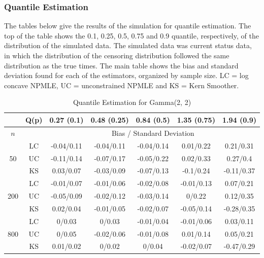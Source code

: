 \documentclass[12pt]{article}
\numberwithin{equation}{section}
\begin{document}
	
	{\subsubsection{Quantile Estimation} } 
	
		The tables below give the results of the simulation for quantile estimation. The top of the table shows the 0.1, 0.25, 0.5, 0.75 and 0.9 quantile, respectively, of the distribution of the simulated data. The simulated data was current status data, in which the distribution of the censoring distribution followed the same distribution as the true times. The main table shows the bias and standard deviation found for each of the estimators, organized by sample size. LC = log concave NPMLE, UC = unconstrained NPMLE and KS = Kern Smoother.
	


\begin{table}[H]

\begin{center}	
\caption{Quantile Estimation for Gamma(2, 2)}

\begin{tabular} {| c | c | c | c | c | c | c | } 


	 \hline
		&Q(p)&	0.27 (0.1)&	0.48 (0.25)&	0.84 (0.5)&	1.35 (0.75)&	1.94 (0.9)\\ 
 \hline 
 	$n$ & & \multicolumn{5}{|c|}{Bias / Standard Deviation} 
 \\ 
 \hline 
\multirow{3}{*}{50}		&	LC	&-0.04/0.11	&-0.04/0.11	&-0.04/0.14	&0.01/0.22	&0.21/0.31\\ 
			&	UC	&-0.11/0.14	&-0.07/0.17	&-0.05/0.22	&0.02/0.33	&0.27/0.4\\ 
			&	KS	&0.03/0.07	&-0.03/0.09	&-0.07/0.13	&-0.1/0.24	&-0.11/0.37\\ 
	\hline 
\multirow{3}{*}{200}		&	LC	&-0.01/0.07	&-0.01/0.06	&-0.02/0.08	&-0.01/0.13	&0.07/0.21\\ 
			&	UC	&-0.05/0.09	&-0.02/0.12	&-0.03/0.14	&0/0.22	&0.12/0.35\\ 
			&	KS	&0.02/0.04	&-0.01/0.05	&-0.02/0.07	&-0.05/0.14	&-0.28/0.35\\ 
	\hline 
\multirow{3}{*}{800}		&	LC	&0/0.03	&0/0.03	&-0.01/0.04	&-0.01/0.06	&0.03/0.11\\ 
			&	UC	&0/0.05	&-0.02/0.06	&-0.01/0.08	&0.01/0.14	&0.05/0.21\\ 
			&	KS	&0.01/0.02	&0/0.02	&0/0.04	&-0.02/0.07	&-0.47/0.29\\ 
	\hline 

\end{tabular}
\end{center}

\end{table}
\end{document}
